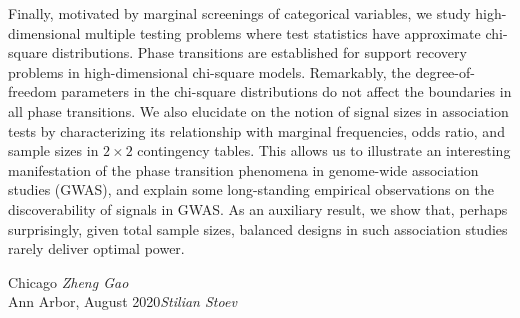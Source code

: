 {Finally, motivated by marginal screenings of categorical variables, we study high-dimensional multiple testing problems where test statistics have approximate chi-square distributions.
Phase transitions are established for support recovery problems in high-dimensional chi-square models.
Remarkably, the degree-of-freedom parameters in the chi-square distributions do not affect the boundaries in all phase transitions.
We also elucidate on the notion of signal sizes in association tests by characterizing its relationship with marginal frequencies, odds ratio, and sample sizes in $2\times2$ contingency tables. 
This allows us to illustrate an interesting manifestation of the phase transition phenomena in %
genome-wide association studies (GWAS), 
and explain some long-standing empirical observations on the discoverability of signals in GWAS.
As an auxiliary result, we show that, perhaps surprisingly, given total sample sizes, balanced designs in such association studies rarely deliver optimal power. }


\vspace{\baselineskip}
\begin{flushright}\noindent
Chicago \hfill {\it Zheng Gao }\\
Ann Arbor, August 2020\hfill {\it Stilian Stoev}\\
\end{flushright}


